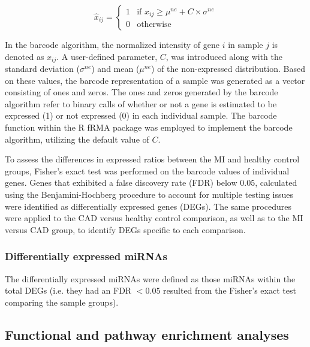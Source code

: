 \documentclass[sn-mathphys,Numbered]{sn-jnl}%
\theoremstyle{thmstyleone}%
\theoremstyle{thmstyletwo}%
\theoremstyle{thmstylethree}%
\begin{document}
\begin{equation}
\hat{x}_{ij} =
\begin{cases}
1 & \text{if } x_{ij} \geq \mu^{ne} + C \times \sigma^{ne} \\
0 & \text{otherwise}
\end{cases}
\end{equation}

In the barcode algorithm, the normalized intensity of gene $i$ in
sample $j$ is denoted as $x_{ij}$. A user-defined parameter, $C$,
was introduced along with the standard deviation ($\sigma^{ne}$) and
mean ($\mu^{ne}$) of the non-expressed distribution. Based on these
values, the barcode representation of a sample was generated as a vector
consisting of ones and zeros. 
The ones and zeros generated by the barcode algorithm refer to binary calls of whether or not a gene is estimated to be expressed (1) or not expressed (0) in each individual sample. 
The barcode function within the R fRMA package was employed to implement the barcode
algorithm, utilizing the default value of $C$.

To assess the differences in expressed ratios between the MI and healthy
control groups, Fisher's exact test was performed on the barcode values
of individual genes. Genes that exhibited a false discovery rate (FDR)
below $0.05$, calculated using the Benjamini-Hochberg procedure to
account for multiple testing issues were identified as differentially
expressed genes (DEGs). The same procedures were applied to the CAD
versus healthy control comparison, as well as to the MI versus CAD
group, to identify DEGs specific to each comparison.

\subsubsection{Differentially expressed miRNAs}\label{differentially-expressed-miRNAs}

The differentially expressed miRNAs were defined as those miRNAs within the total DEGs (i.e. they had an FDR $< 0.05$ resulted from the Fisher's exact test comparing the sample groups).


\subsection{Functional and pathway enrichment
analyses}\label{functional-and-pathway-enrichment-analyses}
\end{document}
